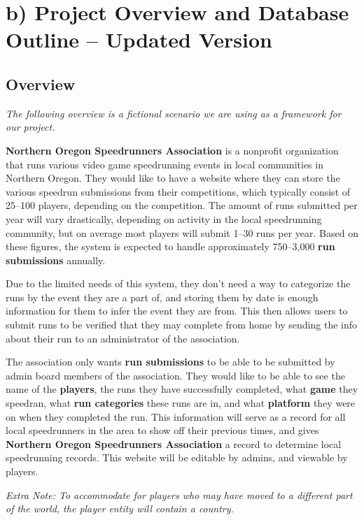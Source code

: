 \documentclass[11pt]{article}
\begin{document}
\section*{b) Project Overview and Database Outline -- Updated Version}

\subsection*{Overview}

\textit{The following overview is a fictional scenario we are using as a framework for our project.}

\textbf{Northern Oregon Speedrunners Association} is a nonprofit organization that runs various video game speedrunning events in local communities in Northern Oregon. They would like to have a website where they can store the various speedrun submissions from their competitions, which typically consist of 25--100 players, depending on the competition. The amount of runs submitted per year will vary drastically, depending on activity in the local speedrunning community, but on average most players will submit 1--30 runs per year. Based on these figures, the system is expected to handle approximately 750--3,000 \textbf{run submissions} annually.

Due to the limited needs of this system, they don't need a way to categorize the runs by the event they are a part of, and storing them by date is enough information for them to infer the event they are from. This then allows users to submit runs to be verified that they may complete from home by sending the info about their run to an administrator of the association.

The association only wants \colorbox{submissioncolor!30}{\textbf{run submissions}} to be able to be submitted by admin board members of the association. They would like to be able to see the name of the \colorbox{playercolor!30}{\textbf{players}}, the runs they have successfully completed, what \colorbox{gamecolor!30}{\textbf{game}} they speedran, what \colorbox{categorycolor!30}{\textbf{run categories}} these runs are in, and what \colorbox{platformcolor!30}{\textbf{platform}} they were on when they completed the run. This information will serve as a record for all local speedrunners in the area to show off their previous times, and gives \textbf{Northern Oregon Speedrunners Association} a record to determine local speedrunning records. This website will be editable by admins, and viewable by players.

\textit{Extra Note: To accommodate for players who may have moved to a different part of the world, the player entity will contain a country.}
\end{document}
